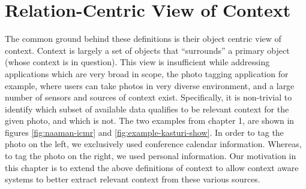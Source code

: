 \section{Relation-Centric View of Context}

The common ground behind these definitions is their object centric view of context. Context is largely a set of objects that ``surrounds'' a primary object (whose context is in question). This view is insufficient while addressing applications which are very broad in scope, the photo tagging application for example, where users can take photos in very diverse environment, and a large number of sensors and sources of context exist. Specifically, it is non-trivial to identify which subset of available data qualifies to be relevant context for the given photo, and which is not. The two examples from chapter 1, are shown in figures \ref{fig:naaman-icmr} and \ref{fig:example-kasturi-show}. In order to tag the photo on the left, we exclusively used conference calendar information. Whereas, to tag the photo on the right, we used personal information. Our motivation in this chapter is to extend the above definitions of context to allow context aware systems to better extract relevant context from these various sources.

